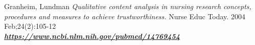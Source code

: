 \documentclass[12pt,a4paper,oneside]{article}
\renewcommand{\_}{\hspace{0.1cm}}
\begin{document}
\begin{thebibliography}{11}
Granheim, Lundman \emph{Qualitative content analysis in nursing research concepts, procedures and measures to achieve trustworthiness.} Nurse Educ Today. 2004 Feb;24(2):105-12 \\\textbf{\emph{\href{https://www.ncbi.nlm.nih.gov/pubmed/14769454}{\url{https://www.ncbi.nlm.nih.gov/pubmed/14769454}}}}



\end{thebibliography} 
 
\end{document}
